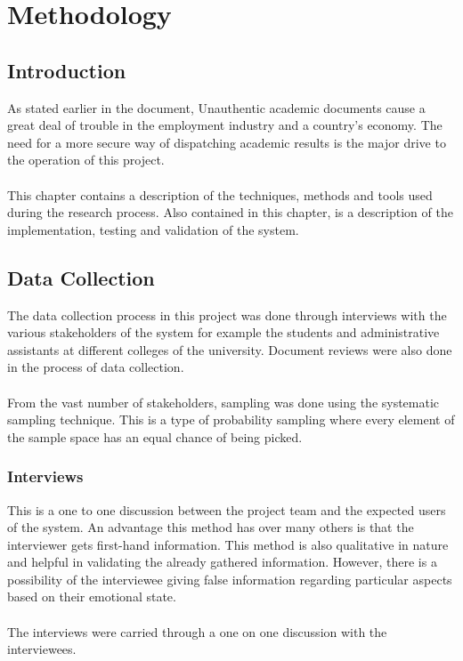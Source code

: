 \chapter{Methodology}

\section{Introduction}
As stated earlier in the document, Unauthentic academic documents cause a great deal of trouble in the employment industry and a country's economy. The need for a more secure way of dispatching academic results is the major drive to the operation of this project. \\~\\

This chapter contains a description of the techniques, methods and tools used during the research process. Also contained in this chapter, is a description of the implementation, testing and validation of the system. 

\section{Data Collection}
The data collection process in this project was done through interviews with the various stakeholders of the system for example the students and administrative assistants at different colleges of the university. Document reviews were also done in the process of data collection.\\~\\
From the vast number of stakeholders, sampling was done using the systematic sampling technique. This is a type of probability sampling where every element of the sample space has an equal chance of being picked. 

\subsection{Interviews}

This is a one to one discussion between the project team and the expected users of the system. An advantage this method has over many others is that the interviewer gets first-hand information. This method is also qualitative in nature and  helpful in validating the already gathered information. However, there is a possibility of the interviewee giving false information regarding particular aspects based on their emotional state. \\~\\
The interviews were carried through a one on one discussion with the interviewees.\\~\\

